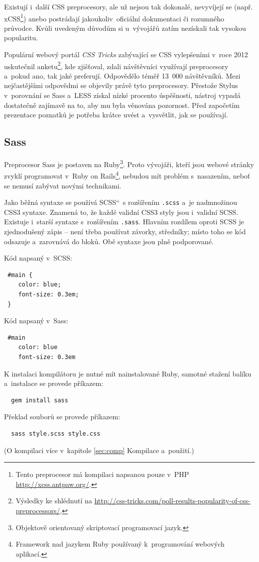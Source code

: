 \documentclass[thesis=B,czech]{FITthesis}[2012/06/26]
\begin{document}
Existují i~další \gls{CSS} preprocesory, ale už nejsou tak dokonalé, nevyvíjejí se (např. xCSS\footnote{Tento preprocesor má kompilaci napsanou pouze v~\gls{PHP} \url{http://xcss.antpaw.org/}.}) anebo postrádají jakoukoliv~oficiální dokumentaci či rozumného průvodce. Kvůli uvedeným důvodům si u~vývojářů zatím nezískali tak vysokou popularitu.

Populární webový portál \textit{CSS Tricks} zabývající se \gls{CSS} vylepšeními v~roce 2012 uskutečnil anketu\footnote{Výsledky ke shlédnutí na \url{http://css-tricks.com/poll-results-popularity-of-css-preprocessors/}.}, kde zjišťoval, zdali návštěvníci využívají preprocesory a~pokud ano, tak jaké preferují. Odpovědělo téměř 13~000 návštěvníků. Mezi nejčastějšími odpovědmi se objevily právě tyto preprocesory. Přestože Stylus v~porovnání se \gls{Sass} a~LESS získal nízké procento úspěšnosti, nástroj vypadá dostatečně zajímavě na to, aby mu byla věnována pozornost. Před započetím prezentace poznatků je potřeba krátce uvést a~vysvětlit, jak se používají. 


\subsection{Sass}

Preprocesor \gls{Sass} je postaven na Ruby\footnote{Objektově orientovaný skriptovací programovací jazyk.}. Proto vývojáři, kteří jsou webové stránky zvyklí programovat v~Ruby on Rails\footnote{Framework nad jazykem Ruby používaný k~programování webových aplikací.}, nebudou mít problém s~nasazením, neboť se nemusí zabývat novými technikami. 

Jako běžná syntaxe se používá \quotedblbase SCSS\textquotedblleft   ~s rozšířením \verb#.scss# a~je nadmnožinou CSS3 syntaxe. Znamená to, že každé validní CSS3 styly jsou i~validní SCSS. Existuje i~starší syntaxe s~rozšířením \verb#.sass#. Hlavním rozdílem oproti SCSS je zjednodušený zápis -- není třeba používat závorky, středníky; místo toho se kód odsazuje a~zarovnává do bloků. Obě syntaxe jsou plně podporované.

\noindent Kód napsaný v~SCSS:
\scriptsize
\begin{verbatim}
 #main {
    color: blue;
    font-size: 0.3em;
 }
\end{verbatim}
\normalsize
Kód napsaný v~\gls{Sass}:
\scriptsize
\begin{verbatim}
 #main
    color: blue
    font-size: 0.3em
\end{verbatim}
\normalsize
K instalaci kompilátoru je nutné mít nainstalované Ruby, samotné stažení balíku a~instalace se provede příkazem:
\scriptsize
\begin{verbatim}
  gem install sass
\end{verbatim}
\normalsize
Překlad souborů se provede příkazem:
\scriptsize
\begin{verbatim}
  sass style.scss style.css
\end{verbatim}
\normalsize
(O kompilaci více v~kapitole \ref{sec:comp} Kompilace a~použití.)
\end{document}
